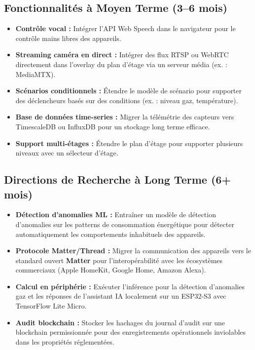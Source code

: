 \subsection{Fonctionnalités à Moyen Terme (3--6 mois)}

\begin{itemize}[leftmargin=1.5cm,itemsep=6pt]
  \item \textbf{Contrôle vocal :} Intégrer l'API Web Speech dans le navigateur pour le
        contrôle mains libres des appareils.
  \item \textbf{Streaming caméra en direct :} Intégrer des flux RTSP ou WebRTC directement
        dans l'overlay du plan d'étage via un serveur média (ex. : MediaMTX).
  \item \textbf{Scénarios conditionnels :} Étendre le modèle de scénario pour supporter
        des déclencheurs basés sur des conditions (ex. : niveau gaz, température).
  \item \textbf{Base de données time-series :} Migrer la télémétrie des capteurs vers
        TimescaleDB ou InfluxDB pour un stockage long terme efficace.
  \item \textbf{Support multi-étages :} Étendre le plan d'étage pour supporter plusieurs
        niveaux avec un sélecteur d'étage.
\end{itemize}

\subsection{Directions de Recherche à Long Terme (6+ mois)}

\begin{itemize}[leftmargin=1.5cm,itemsep=6pt]
  \item \textbf{Détection d'anomalies ML :} Entraîner un modèle de détection d'anomalies
        sur les patterns de consommation énergétique pour détecter automatiquement les
        comportements inhabituels des appareils.
  \item \textbf{Protocole Matter/Thread :} Migrer la communication des appareils vers
        le standard ouvert \textbf{Matter} pour l'interopérabilité avec les écosystèmes
        commerciaux (Apple HomeKit, Google Home, Amazon Alexa).
  \item \textbf{Calcul en périphérie :} Exécuter l'inférence pour la détection d'anomalies
        gaz et les réponses de l'assistant IA localement sur un ESP32-S3 avec TensorFlow
        Lite Micro.
  \item \textbf{Audit blockchain :} Stocker les hachages du journal d'audit sur une
        blockchain permissionnée pour des enregistrements opérationnels inviolables dans
        les propriétés réglementées.
\end{itemize}

